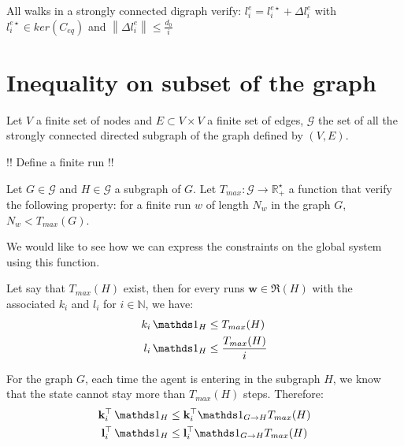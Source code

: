 \documentclass{article}
\begin{document}
\begin{property}
All walks in a strongly connected digraph verify:
$l^e_i = l^{e \star}_i + \Delta l^e_i$
with 
$l^{e \star}_i \in ker(C_{eq})$
and
$\left \| \Delta l^e_i  \right \| \leq \frac{d_0}{i}$
\end{property}

\section{Inequality on subset of the graph}
Let $V$ a finite set of nodes and $E \subset V \times V$ a finite set of edges,
$\mathcal{G}$ the set of all the strongly connected directed subgraph of the graph defined by $(V,E)$.

!! Define a finite run !!

Let $G \in \mathcal{G}$ and $H \in \mathcal{G}$ a subgraph of $G$.
Let $T_{max} : \mathcal{G} \rightarrow \mathbb{R}_+^\star$ a function that verify the following property: for a finite run $w$ of length $N_w$ in the graph $G$, $N_w < T_{max}(G)$.

We would like to see how we can express the constraints on the global system using this function.

Let say that $T_{max}(H)$ exist, then for every runs $\mathbf{w} \in \mathfrak{R}(H)$ with the associated $k_i$ and $l_i$ for $i \in \mathbb{N}$, we have:
\begin{align*}
k_i \, \vone_H & \leq T_{max}(H) \\
l_i \, \vone_H & \leq \frac{T_{max}(H)}{i}
\end{align*}

For the graph $G$, each time the agent is entering in the subgraph $H$, we know that the state cannot stay more than $T_{max}(H)$ steps. Therefore:
\begin{align*}
\mathbf{k}_i^\top \, \vone_H & \leq \mathbf{k}_i^\top \vone_{G \rightarrow H} T_{max}(H)\\
\mathbf{l}_i^\top \, \vone_H & \leq \mathbf{l}_i^\top \vone_{G \rightarrow H} T_{max}(H)\\
\end{align*}
\end{document}
